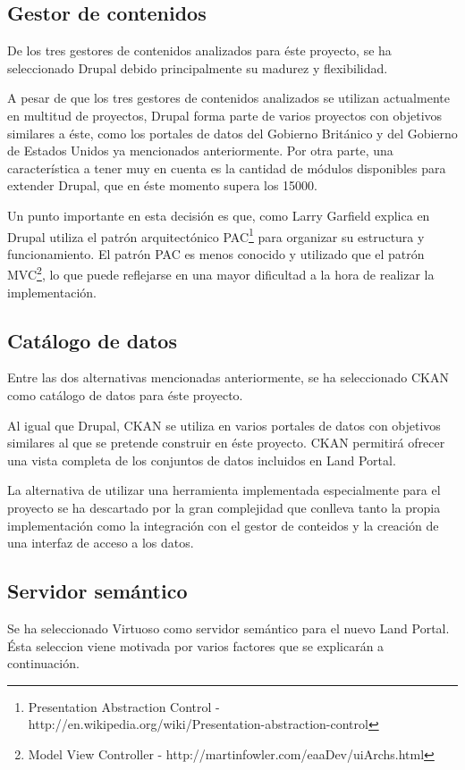 \subsection{Gestor de contenidos}
De los tres gestores de contenidos analizados para éste proyecto, se ha seleccionado Drupal debido principalmente su madurez y flexibilidad.

A pesar de que los tres gestores de contenidos analizados se utilizan actualmente en multitud de proyectos, Drupal forma parte de varios proyectos con objetivos similares a éste, como los portales de datos del Gobierno Británico y del Gobierno de Estados Unidos ya mencionados anteriormente. Por otra parte, una característica a tener muy en cuenta es la cantidad de módulos disponibles para extender Drupal, que en éste momento supera los 15000.

Un punto importante en esta decisión es que, como Larry Garfield explica en \cite[]{pac-vs-mvc} Drupal utiliza el patrón arquitectónico PAC\footnote{Presentation Abstraction Control - http://en.wikipedia.org/wiki/Presentation-abstraction-control} para organizar su estructura y funcionamiento.  El patrón PAC es menos conocido y utilizado que el patrón MVC\footnote{Model View Controller - http://martinfowler.com/eaaDev/uiArchs.html}, lo que puede reflejarse en una mayor dificultad a la hora de realizar la implementación.


\subsection{Catálogo de datos}
Entre las dos alternativas mencionadas anteriormente, se ha seleccionado CKAN como catálogo de datos para éste proyecto.

Al igual que Drupal, CKAN se utiliza en varios portales de datos con objetivos similares al que se pretende construir en éste proyecto. CKAN permitirá ofrecer una vista completa de los conjuntos de datos incluidos en Land Portal.

La alternativa de utilizar una herramienta implementada especialmente para el proyecto se ha descartado por la gran complejidad que conlleva tanto la propia implementación como la integración con el gestor de conteidos y la creación de una interfaz de acceso a los datos.


\subsection{Servidor semántico}
Se ha seleccionado Virtuoso como servidor semántico para el nuevo Land Portal. Ésta seleccion viene motivada por varios factores que se explicarán a continuación.

